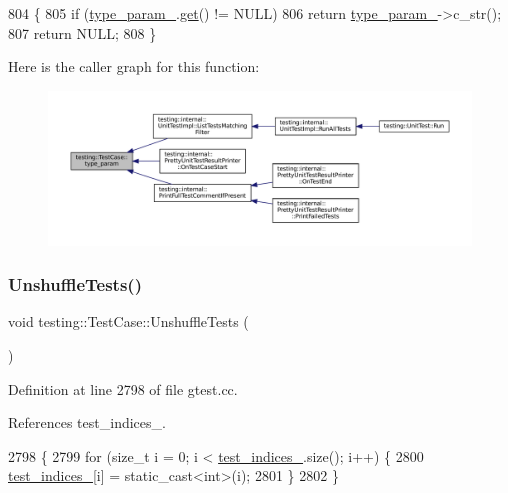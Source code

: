 \begin{DoxyCode}
804                                  \{
805     \textcolor{keywordflow}{if} (\hyperlink{classtesting_1_1TestCase_a4952403fca9baa20275b3fcdc28977db}{type\_param\_}.\hyperlink{classtesting_1_1internal_1_1scoped__ptr_aa5984291e12453f1e81b7676d1fa26fd}{get}() != NULL)
806       \textcolor{keywordflow}{return} \hyperlink{classtesting_1_1TestCase_a4952403fca9baa20275b3fcdc28977db}{type\_param\_}->c\_str();
807     \textcolor{keywordflow}{return} NULL;
808   \}
\end{DoxyCode}
Here is the caller graph for this function\+:
\nopagebreak
\begin{figure}[H]
\begin{center}
\leavevmode
\includegraphics[width=350pt]{classtesting_1_1TestCase_a9df62c4104a4f856b477c9e8335bb689_icgraph}
\end{center}
\end{figure}
\mbox{\label{classtesting_1_1TestCase_ad54a66cd65b4420c960d6db79b7cadf6}} 
\subsubsection{\texorpdfstring{Unshuffle\+Tests()}{UnshuffleTests()}}
{\footnotesize\ttfamily void testing\+::\+Test\+Case\+::\+Unshuffle\+Tests (\begin{DoxyParamCaption}{ }\end{DoxyParamCaption})\hspace{0.3cm}{\ttfamily [private]}}



Definition at line 2798 of file gtest.\+cc.



References test\+\_\+indices\+\_\+.


\begin{DoxyCode}
2798                               \{
2799   \textcolor{keywordflow}{for} (\textcolor{keywordtype}{size\_t} i = 0; i < \hyperlink{classtesting_1_1TestCase_a6bb04b98c46a3eecf7a4e6f62593a827}{test\_indices\_}.size(); i++) \{
2800     \hyperlink{classtesting_1_1TestCase_a6bb04b98c46a3eecf7a4e6f62593a827}{test\_indices\_}[i] = \textcolor{keyword}{static\_cast<}\textcolor{keywordtype}{int}\textcolor{keyword}{>}(i);
2801   \}
2802 \}
\end{DoxyCode}


